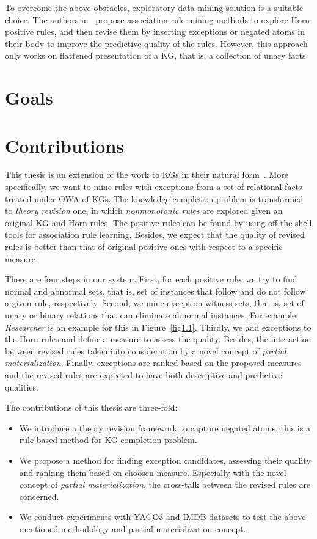 To overcome the above obstacles, exploratory data mining solution is a suitable choice. The authors in~\cite{ref12} propose association rule mining methods to explore Horn positive rules, and then revise them by inserting exceptions or negated atoms in their body to improve the predictive quality of the rules. However, this approach only works on flattened presentation of a KG, that is, a collection of unary facts.

\section{Goals}

\section{Contributions}

This thesis is an extension of the work to KGs in their natural form~\cite{ref12}. More specifically, we want to mine rules with exceptions from a set of relational facts treated under OWA of KGs. The knowledge completion problem is transformed to \textit{theory revision} one, in which \textit{nonmonotonic rules} are explored given an original KG and Horn rules. The positive rules can be found by using off-the-shell tools for association rule learning. Besides, we expect that the quality of revised rules is better than that of original positive ones with respect to a specific measure.

There are four steps in our system. First, for each positive rule, we try to find normal and abnormal sets, that is, set of instances that follow and do not follow a given rule, respectively. Second, we mine exception witness sets, that is, set of unary or binary relations that can eliminate abnormal instances. For example, \textit{Researcher} is an example for this in Figure~\ref{fig1.1}. Thirdly, we add exceptions to the Horn rules and define a measure to assess the quality. Besides, the interaction between revised rules taken into consideration by a novel concept of \textit{partial materialization}. Finally, exceptions are ranked based on the proposed measures and the revised rules are expected to have both descriptive and predictive qualities.

The contributions of this thesis are three-fold:

\begin{itemize}
\item We introduce a theory revision framework to capture negated atoms, this is a rule-based method for KG completion problem.
\item We propose a method for finding exception candidates, assessing their quality and ranking them based on choosen measure. Especially with the novel concept of \textit{partial materialization}, the cross-talk between the revised rules are concerned.
\item We conduct experiments with YAGO3 and IMDB datasets to test the above-mentioned methodology and partial materialization concept.
\end{itemize}

